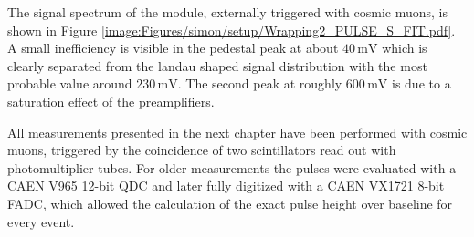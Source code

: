 The signal spectrum of the module, externally triggered with cosmic muons, is shown in Figure \ref{image:Figures/simon/setup/Wrapping2_PULSE_S_FIT.pdf}. A small inefficiency is visible in the pedestal peak at about $40\,\text{mV}$ which is clearly separated from the landau shaped signal distribution with the most probable value around $230\,\text{mV}$. The second peak at roughly $600\,\text{mV}$ is due to a saturation effect of the preamplifiers.

All measurements presented in the next chapter have been performed with cosmic muons, triggered by the coincidence of two scintillators read out with photomultiplier tubes. For older measurements the pulses were evaluated with a CAEN V965 12-bit QDC and later fully digitized with a CAEN VX1721 8-bit FADC, which allowed the calculation of the exact pulse height over baseline for every event.